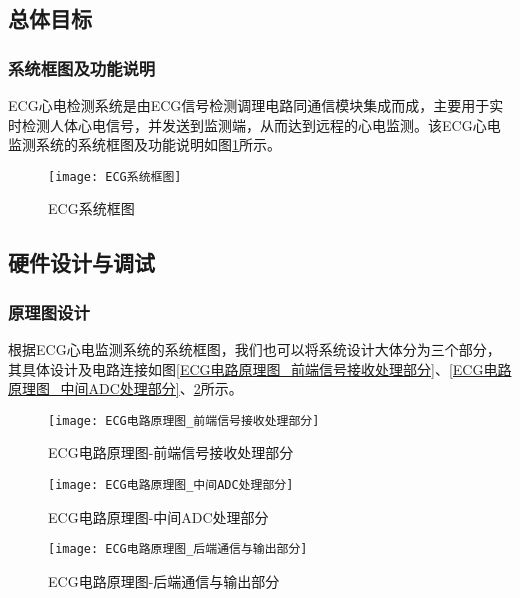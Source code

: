 \documentclass{zjureport}
\begin{document}
	\subsection{总体目标}
	
	
	
	\subsubsection{系统框图及功能说明}
	
	ECG心电检测系统是由ECG信号检测调理电路同通信模块集成而成，主要用于实时检测人体心电信号，并发送到监测端，从而达到远程的心电监测。该ECG心电监测系统的系统框图及功能说明如图\ref{ECG系统框图}所示。
	
	\begin{figure}[H]
		\centering%
		\texttt{[image: ECG系统框图]}
		\caption{ECG系统框图}%
		\label{ECG系统框图}%
	\end{figure}
	
	\newpage
	
	\subsection{硬件设计与调试}
	
	\subsubsection{原理图设计}
	
	根据ECG心电监测系统的系统框图，我们也可以将系统设计大体分为三个部分，其具体设计及电路连接如图\ref{ECG电路原理图_前端信号接收处理部分}、\ref{ECG电路原理图_中间ADC处理部分}、\ref{ECG电路原理图_后端通信与输出部分}所示。
	
	\begin{figure}[H]
		\centering
		\begin{minipage}[t]{0.49\linewidth}%
			\texttt{[image: ECG电路原理图\_前端信号接收处理部分]}%
			\caption{ECG电路原理图-前端信号接收处理部分}
			\label{ECG电路原理图_前端信号接收处理部分}
		\end{minipage}%
		\begin{minipage}[t]{0.49\linewidth}
			\texttt{[image: ECG电路原理图\_中间ADC处理部分]}
			\caption{ECG电路原理图-中间ADC处理部分}
			\label{ECG电路原理图_中间ADC处理部分}
		\end{minipage}
		
		\begin{minipage}[t]{0.49\linewidth}%
			\texttt{[image: ECG电路原理图\_后端通信与输出部分]}%
			\caption{ECG电路原理图-后端通信与输出部分}
			\label{ECG电路原理图_后端通信与输出部分}
		\end{minipage}%
	\end{figure}
	
\end{document}
